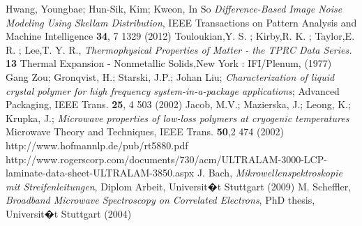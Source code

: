 \begin{thebibliography}{9}
 Hwang, Youngbae; Hun-Sik, Kim; Kweon, In So
\textit{Difference-Based Image Noise Modeling Using Skellam Distribution}, IEEE
Transactions on Pattern Analysis and Machine Intelligence \textbf{34}, 7 1329
(2012) 
 Touloukian,Y.
S.
; Kirby,R.
K.
; Taylor,E.
R.
; Lee,T. Y. R.,
\textit{Thermophysical Properties of Matter - the TPRC Data Series.} 
\textbf{13} Thermal Expansion - Nonmetallic Solids,New York : IFI/Plenum, (1977)
 Gang Zou;    Gronqvist, H.;    Starski, J.P.;   
Johan Liu;   \textit{Characterization of liquid crystal polymer for high
frequency system-in-a-package applications}; Advanced Packaging, IEEE
Trans.  \textbf{25}, 4 503 (2002)
Jacob, M.V.;   Mazierska, J.;   Leong, K.;   Krupka, J.;   \textit{Microwave
properties of low-loss polymers at cryogenic temperatures} Microwave Theory and
Techniques, IEEE Trans. \textbf{50},2 474 (2002) 
 http://www.hofmannlp.de/pub/rt5880.pdf
http://www.rogerscorp.com/documents/730/acm/ULTRALAM-3000-LCP-laminate-data-sheet-ULTRALAM-3850.aspx
 J. Bach, \textit{Mikrowellenspektroskopie mit
Streifenleitungen}, Diplom Arbeit, Universit�t Stuttgart (2009) 
 M. Scheffler, \textit{Broadband Microwave Spectroscopy on
Correlated Electrons}, PhD thesis, Universit�t Stuttgart (2004)

\end{thebibliography}